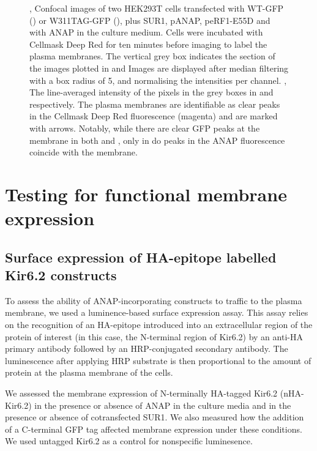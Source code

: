 \begin{figure}[h]
\begin{subfigure}[t]{0.35\textwidth}
	\end{subfigure}
	\caption[Confocal imaging]{
	,  Confocal images of two HEK293T cells transfected with WT-GFP () or W311TAG-GFP (), plus SUR1, pANAP, peRF1-E55D and with ANAP in the culture medium.
	Cells were incubated with Cellmask Deep Red for ten minutes before imaging to label the plasma membranes.
	The vertical grey box indicates the section of the images plotted in  and 
	Images are displayed after median filtering with a box radius of 5, and normalising the intensities per channel.
	, The line-averaged intensity of the pixels in the grey boxes in  and  respectively.
	The plasma membranes are identifiable as clear peaks in the Cellmask Deep Red fluorescence (magenta) and are marked with arrows.
	Notably, while there are clear GFP peaks at the membrane in both  and , only in  do peaks in the ANAP fluorescence coincide with the membrane.
	}
\end{figure}

\section{Testing for functional membrane expression}

\subsection{Surface expression of HA-epitope labelled Kir6.2 constructs}

To assess the ability of ANAP-incorporating constructs to traffic to the plasma membrane, we used a luminence-based surface expression assay.
This assay relies on the recognition of an HA-epitope introduced into an extracellular region of the protein of interest (in this case, the N-terminal region of Kir6.2) by an anti-HA primary antibody followed by an HRP-conjugated secondary antibody.
The luminescence after applying HRP substrate is then proportional to the amount of protein at the plasma membrane of the cells.

We assessed the membrane expression of N-terminally HA-tagged Kir6.2 (nHA-Kir6.2) in the presence or absence of ANAP in the culture media and in the presence or absence of cotransfected SUR1.
We also measured how the addition of a C-terminal GFP tag affected membrane expression under these conditions.
We used untagged Kir6.2 as a control for nonspecific luminesence.

